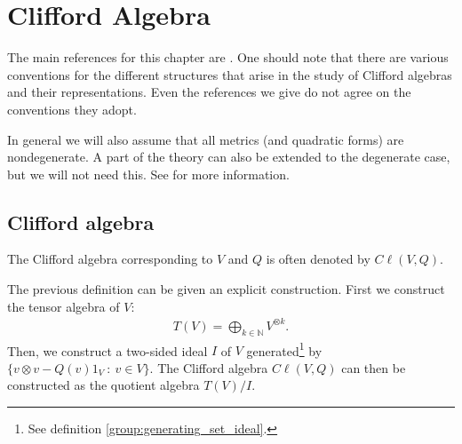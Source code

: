 \chapter{Clifford Algebra}\label{chapter:clifford}

    The main references for this chapter are \cite{AMP1, AMP2, gallier_clifford}. One should note that there are various conventions for the different structures that arise in the study of Clifford algebras and their representations. Even the references we give do not agree on the conventions they adopt.

    In general we will also assume that all metrics (and quadratic forms) are nondegenerate. A part of the theory can also be extended to the degenerate case, but we will not need this. See \cite{gallier_clifford} for more information.

\section{Clifford algebra}

    \begin{notation}
        The Clifford algebra corresponding to $V$ and $Q$ is often denoted by $C\ell(V, Q)$.
    \end{notation}

    \begin{construct}
        The previous definition can be given an explicit construction. First we construct the tensor algebra of $V$:
        \begin{gather}
            T(V) = \bigoplus_{k\in\mathbb{N}}V^{\otimes k}.
        \end{gather}
        Then, we construct a two-sided ideal $I$ of $V$ generated\footnote{See definition \ref{group:generating_set_ideal}.} by $\{v\otimes v - Q(v)1_V\ :\ v\in V\}$. The Clifford algebra $C\ell(V, Q)$ can then be constructed as the quotient algebra $T(V)/I$.
    \end{construct}

